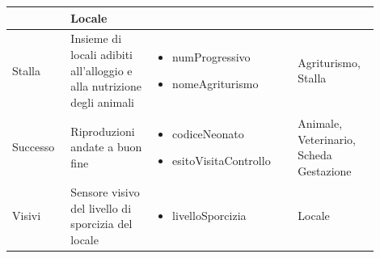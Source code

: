 \documentclass[12pt,a4paper]{article}
\begin{document}
\begin{center}
\begin{longtable}{|p{0.14\linewidth}|p{0.20\linewidth}|p{0.36\linewidth}|p{0.20\linewidth}|}
\begin{itemize}
					\end{itemize}
					&  Locale \\

\hline
Stalla 				&  Insieme di locali adibiti all'alloggio e alla nutrizione degli animali  
					& \begin{itemize}
						\setlength{\itemindent}{-1em}
						\vspace{-25pt}
						\setlength\itemsep{-0.25em}
						\item numProgressivo
						\item nomeAgriturismo
					\end{itemize} 
					&  Agriturismo, Stalla  \\

\hline
Successo				&  Riproduzioni andate a buon fine 
					& \begin{itemize}
						\setlength{\itemindent}{-1em}
						\vspace{-25pt}
						\setlength\itemsep{-0.25em}
						\item codiceNeonato
						\item esitoVisitaControllo
					\end{itemize}
					&  Animale, Veterinario, Scheda Gestazione \\

\hline
Visivi 				&  Sensore visivo del livello di sporcizia del locale  
					& \begin{itemize}
						\setlength{\itemindent}{-1em}
						\vspace{-25pt}
						\setlength\itemsep{-0.25em}
						\item livelloSporcizia
					\end{itemize}
					&  Locale \\

\hline

\end{longtable}
\end{center}
\end{document}
